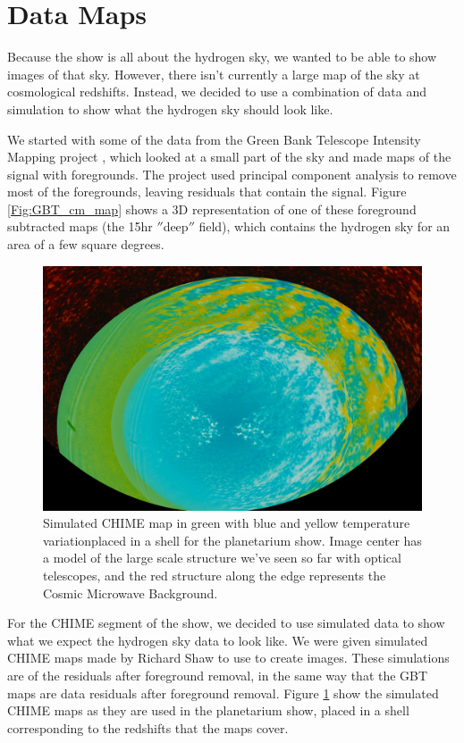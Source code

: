 \section{\cm Data Maps}
Because the show is all about the hydrogen sky, we wanted to be able to show images of that sky. However, there isn't currently a large map of the \cm sky at cosmological redshifts. Instead, we decided to use a combination of data and simulation to show what the hydrogen sky should look like.

We started with some of the data from the Green Bank Telescope Intensity Mapping project \cite{masui_2012}\cite{switzer_2013}, which looked at a small part of the sky and made maps of the \cm signal with foregrounds. The project used principal component analysis to remove most of the foregrounds, leaving residuals that contain the \cm signal. Figure \ref{Fig:GBT_cm_map} shows a 3D representation of one of these foreground subtracted maps (the 15hr $''$deep$''$ field), which contains the hydrogen sky for an area of a few square degrees. 

\begin{figure}[htb]
\begin{center}
\includegraphics[width=0.95\linewidth]{Planetarium/figures/CHIME_cm_map.jpg}
\caption{Simulated CHIME map in green with blue and yellow temperature variationplaced in a shell for the planetarium show. Image center has a model of the large scale structure we've seen so far with optical telescopes, and the red structure along the edge represents the Cosmic Microwave Background.  }
\label{Fig:CHIME_cm_map}
\end{center}
\end{figure}

For the CHIME segment of the show, we decided to use simulated data to show what we expect the hydrogen sky data to look like. We were given simulated CHIME \cm maps made by Richard Shaw \cite{shaw_2014} to use to create images. These simulations are of the \cm residuals after foreground removal, in the same way that the GBT maps are data residuals after foreground removal. Figure \ref{Fig:CHIME_cm_map} show the simulated CHIME maps as they are used in the planetarium show, placed in a shell corresponding to the redshifts that the maps cover. 

